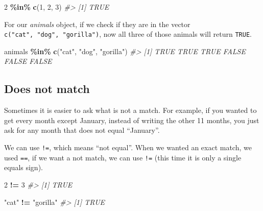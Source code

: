 \documentclass[
  12pt,
]{book}
\newenvironment{Shaded}{\begin{snugshade}}{\end{snugshade}}
\newcommand{\CommentTok}[1]{\textcolor[rgb]{0.37,0.37,0.37}{\textit{#1}}}
\newcommand{\DecValTok}[1]{\textcolor[rgb]{0.06,0.06,0.06}{#1}}
\newcommand{\KeywordTok}[1]{\textcolor[rgb]{0.27,0.27,0.27}{\textbf{#1}}}
\newcommand{\NormalTok}[1]{#1}
\newcommand{\OperatorTok}[1]{\textcolor[rgb]{0.43,0.43,0.43}{\textbf{#1}}}
\newcommand{\StringTok}[1]{\textcolor[rgb]{0.5,0.5,0.5}{#1}}
\begin{document}
\begin{Shaded}
\begin{Highlighting}[]
\DecValTok{2} \OperatorTok{\%in\%}\StringTok{ }\KeywordTok{c}\NormalTok{(}\DecValTok{1}\NormalTok{, }\DecValTok{2}\NormalTok{, }\DecValTok{3}\NormalTok{) }
\CommentTok{\#\textgreater{} [1] TRUE}
\end{Highlighting}
\end{Shaded}

For our \emph{animals} object, if we check if they are in the vector \texttt{c("cat",\ "dog",\ "gorilla")}, now all three of those animals will return \texttt{TRUE}.

\begin{Shaded}
\begin{Highlighting}[]
\NormalTok{animals }\OperatorTok{\%in\%}\StringTok{ }\KeywordTok{c}\NormalTok{(}\StringTok{"cat"}\NormalTok{, }\StringTok{"dog"}\NormalTok{, }\StringTok{"gorilla"}\NormalTok{)}
\CommentTok{\#\textgreater{} [1]  TRUE  TRUE  TRUE FALSE FALSE FALSE}
\end{Highlighting}
\end{Shaded}

\hypertarget{does-not-match}{%
\subsection{Does not match}\label{does-not-match}}

Sometimes it is easier to ask what is not a match. For example, if you wanted to get every month except January, instead of writing the other 11 months, you just ask for any month that does not equal ``January''.

We can use \texttt{!=}, which means ``not equal''. When we wanted an exact match, we used \texttt{==}, if we want a not match, we can use \texttt{!=} (this time it is only a single equals sign).

\begin{Shaded}
\begin{Highlighting}[]
\DecValTok{2} \OperatorTok{!=}\StringTok{ }\DecValTok{3}
\CommentTok{\#\textgreater{} [1] TRUE}
\end{Highlighting}
\end{Shaded}

\begin{Shaded}
\begin{Highlighting}[]
\StringTok{"cat"} \OperatorTok{!=}\StringTok{ "gorilla"}
\CommentTok{\#\textgreater{} [1] TRUE}
\end{Highlighting}
\end{Shaded}
\end{document}

